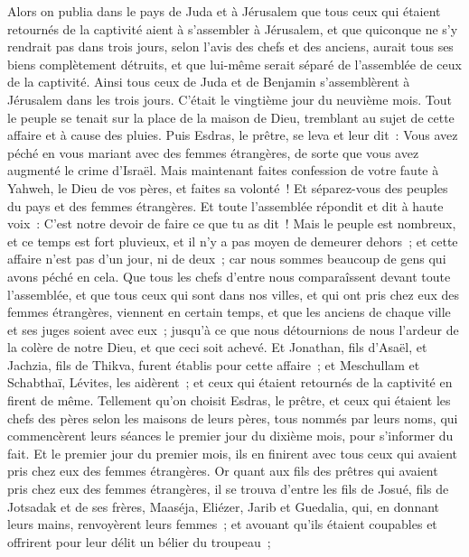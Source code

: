\begin{multicols}{2}
Alors on publia dans le pays de Juda et à Jérusalem que tous ceux qui étaient retournés de la captivité aient à s'assembler à Jérusalem,
et que quiconque ne s'y rendrait pas dans trois jours, selon l'avis des chefs et des anciens, aurait tous ses biens complètement détruits, et que lui-même serait séparé de l'assemblée de ceux de la captivité.
Ainsi tous ceux de Juda et de Benjamin s'assemblèrent à Jérusalem dans les trois jours. C'était le vingtième jour du neuvième mois. Tout le peuple se tenait sur la place de la maison de Dieu, tremblant au sujet de cette affaire et à cause des pluies.
Puis Esdras, le prêtre, se leva et leur dit~: Vous avez péché en vous mariant avec des femmes étrangères, de sorte que vous avez augmenté le crime d'Israël.
Mais maintenant faites confession de votre faute à Yahweh, le Dieu de vos pères, et faites sa volonté~! Et séparez-vous des peuples du pays et des femmes étrangères.
Et toute l'assemblée répondit et dit à haute voix~: C'est notre devoir de faire ce que tu as dit~!
Mais le peuple est nombreux, et ce temps est fort pluvieux, et il n'y a pas moyen de demeurer dehors~; et cette affaire n'est pas d'un jour, ni de deux~; car nous sommes beaucoup de gens qui avons péché en cela.
Que tous les chefs d'entre nous comparaîssent devant toute l'assemblée, et que tous ceux qui sont dans nos villes, et qui ont pris chez eux des femmes étrangères, viennent en certain temps, et que les anciens de chaque ville et ses juges soient avec eux~; jusqu'à ce que nous détournions de nous l'ardeur de la colère de notre Dieu, et que ceci soit achevé.
Et Jonathan, fils d'Asaël, et Jachzia, fils de Thikva, furent établis pour cette affaire~; et Meschullam et Schabthaï, Lévites, les aidèrent~;
et ceux qui étaient retournés de la captivité en firent de même. Tellement qu'on choisit Esdras, le prêtre, et ceux qui étaient les chefs des pères selon les maisons de leurs pères, tous nommés par leurs noms, qui commencèrent leurs séances le premier jour du dixième mois, pour s'informer du fait.
Et le premier jour du premier mois, ils en finirent avec tous ceux qui avaient pris chez eux des femmes étrangères.
Or quant aux fils des prêtres qui avaient pris chez eux des femmes étrangères, il se trouva d'entre les fils de Josué, fils de Jotsadak et de ses frères, Maaséja, Eliézer, Jarib et Guedalia,
qui, en donnant leurs mains, renvoyèrent leurs femmes~; et avouant qu'ils étaient coupables et offrirent pour leur délit un bélier du troupeau~;

\end{multicols}
